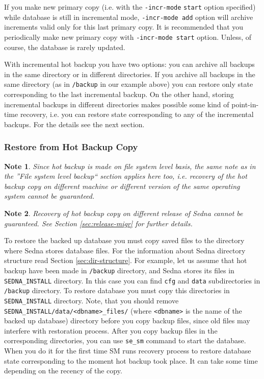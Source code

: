 \documentclass[a4paper,12pt]{article}
\newtheorem{note}{Note}
\begin{document}
If you make new primary copy (i.e. with the \verb!-incr-mode! \verb!start! option specified) while database is still in incremental mode, 
\verb!-incr-mode add! option will archive increments valid only for this last primary copy. It is recommended that you periodically make new primary copy with \verb!-incr-mode start! option. Unless,
of course, the database is rarely updated.

With incremental hot backup you have two options: you can archive all backups in the same directory or in different directories.
If you archive all backups in the same directory (as in \verb!/backup! in our example above) you can restore only state
corresponding to the last incremental backup. On the other hand, storing incremental backups in different directories makes possible
some kind of point-in-time recovery, i.e. you can restore state corresponding to any of the incremental backups. For the details
see the next section.

\subsubsection*{Restore from Hot Backup Copy}

\begin{note}
Since hot backup is made on file system level basis, the same note as in the ''File system level backup`` 
section applies here too, i.e. recovery of the hot backup copy on different machine or different version of the same operating 
system cannot be guaranteed.
\end{note}

\begin{note}
Recovery of hot backup copy on different release of Sedna cannot be guaranteed. See Section \ref{sec:release-migr} for
further details.
\end{note}

To restore the backed up database you must copy saved files to the directory where Sedna stores database files.
For the information about Sedna directory structure read Section \ref{sec:dir-structure}. For example, let us assume that 
hot backup have been made in \verb!/backup! directory, and Sedna stores its files in \verb!SEDNA_INSTALL! directory. 
In this case you can find \verb!cfg! and \verb!data! subdirectories in \verb!/backup! directory. 
To restore database you must copy this directories in \verb!SEDNA_INSTALL! directory.
Note, that you should remove \verb!SEDNA_INSTALL/data/<dbname>_files/! (where \verb!<dbname>! is the name
of the backed up database) directory before you copy backup files, since
old files may interfere with restoration process. After you copy backup files in the corresponding directories, you can 
use \verb!se_sm! command to start the database. When you do it for the first time SM runs recovery process to restore
database state corresponding to the moment hot backup took place. It can take some time depending on the recency of the copy.
\end{document}

